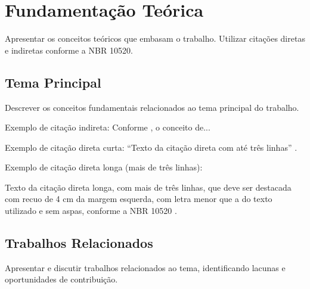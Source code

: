 \chapter{Fundamentação Teórica}
\label{chap:fundamentacao}

Apresentar os conceitos teóricos que embasam o trabalho. Utilizar citações
diretas e indiretas conforme a NBR 10520.

\section{Tema Principal}

Descrever os conceitos fundamentais relacionados ao tema principal do trabalho.

Exemplo de citação indireta: Conforme , o conceito de...

Exemplo de citação direta curta: ``Texto da citação direta com até três linhas''
\cite[p.~100]{autor2020}.

Exemplo de citação direta longa (mais de três linhas):
\begin{citacao}
Texto da citação direta longa, com mais de três linhas, que deve ser
destacada com recuo de 4 cm da margem esquerda, com letra menor que a
do texto utilizado e sem aspas, conforme a NBR 10520 \cite[p.~101]{autor2020}.
\end{citacao}

\section{Trabalhos Relacionados}

Apresentar e discutir trabalhos relacionados ao tema, identificando
lacunas e oportunidades de contribuição.
